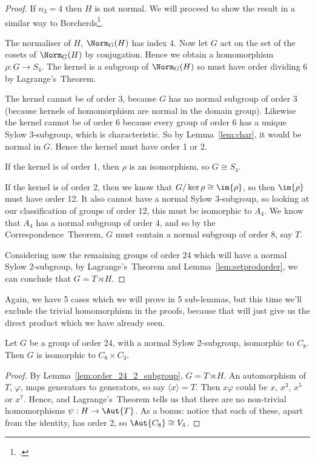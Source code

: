 \begin{proof}
    If \(n_3 = 4\) then \(H\) is not normal.
    We will proceed to show the result in a similar way to Borcherds\footcite{order24}.

    The normaliser of \(H\), \(\Norm_G(H)\) has index 4.
    Now let \(G\) act on the set of the cosets of \(\Norm_G(H)\) by conjugation.
    Hence we obtain a homomorphism \(\rho:G \to S_4\).
    The kernel is a subgroup of \(\Norm_G(H)\) so must have order dividing 6 by Lagrange's~Theorem.

    The kernel cannot be of order 3, because \(G\) has no normal subgroup of order 3 (because kernels of homomorphism are
    normal in the domain group).
    Likewise the kernel cannot be of order 6 because every group of order 6 has a unique Sylow 3-subgroup, which is
    characteristic.
    So by Lemma~\ref{lem:char}, it would be normal in \(G\).
    Hence the kernel must have order 1 or 2.

    If the kernel is of order 1, then \(\rho\) is an isomorphism, so \(G \cong S_4\).

    If the kernel is of order 2, then we know that \(G/\ker{\rho} \cong \im{\rho}\), so then \(\im{\rho}\) must have order
    12.
    It also cannot have a normal Sylow 3-subgroup, so looking at our classification of groups of order 12, this must be
    isomorphic to \(A_4\).
    We know that \(A_4\) has a normal subgroup of order 4, and so by the Correspondence~Theorem, \(G\) must contain a normal
    subgroup of order 8, say \(T\).

    Considering now the remaining groups of order 24 which will have a normal Sylow 2-subgroup, by Lagrange's~Theorem and
    Lemma~\ref{lem:setprodorder}, we can conclude that \(G = T \rtimes H\).
\end{proof}

Again, we have 5 cases which we will prove in 5 sub-lemmas, but this time we'll exclude the trivial homomorphism in
the proofs, because that will just give us the direct
product which we have already seen.

\begin{lemma}
    Let \(G\) be a group of order 24, with a normal Sylow 2-subgroup, isomorphic to \(C_8\).
    Then \(G\) is isomorphic to \(C_8 \times C_3\).
\end{lemma}

\begin{proof}
    By Lemma~\ref{lem:order_24_2_subgroup}, \(G = T \rtimes H\).
    An automorphism of \(T\), \(\varphi\), maps generators to generators, so say \(\langle x \rangle = T\).
    Then \(x\varphi\) could be \(x\), \(x^3\), \(x^5\) or \(x^7\).
    Hence, and Lagrange's~Theorem tells us that there are no non-trivial homomorphisms \(\psi:H \to \Aut{T}\).
    As a bonus: notice that each of these, apart from the identity, has order 2, so \(\Aut{C_8} \cong V_4\).
\end{proof}

